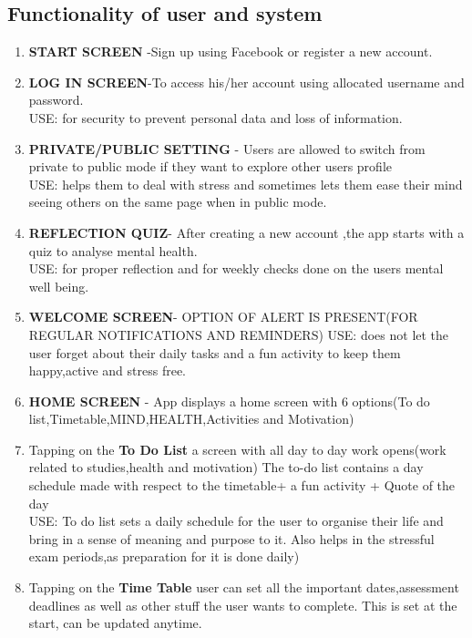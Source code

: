 \documentclass{article}
\begin{document}
\subsection{Functionality of user and system}
\begin{enumerate}
    \item \textbf{ START SCREEN} -Sign up using Facebook or register a new account.\\
    \item \textbf{LOG IN SCREEN}-To access his/her account using allocated username and password.\\
USE: for security to prevent personal data and loss of information.\\
    \item \textbf{PRIVATE/PUBLIC SETTING} - Users are allowed to switch from private to public mode if they want to explore other users profile\\
USE: helps them to deal with stress and sometimes lets them ease their mind seeing others on the same page when in public mode.
    \item \textbf{REFLECTION QUIZ}- After creating a new account ,the app starts with a quiz to analyse mental health.\\
USE: for proper reflection and for weekly checks done on the users mental well being.\\
    \item \textbf{WELCOME SCREEN}- OPTION OF ALERT IS PRESENT(FOR REGULAR NOTIFICATIONS AND REMINDERS)
USE: does not let the user forget about their daily tasks and a fun activity to keep them happy,active and stress free.\\
    \item \textbf{HOME SCREEN} - App displays a home screen with 6 options(To do list,Timetable,MIND,HEALTH,Activities and Motivation) 
    \item Tapping on the \textbf{To Do List} a screen with all day to day work opens(work related to studies,health and motivation) The to-do list contains a day schedule made with respect to the timetable+ a fun activity + Quote of the day\\
USE: To do list sets a daily schedule for the user to organise their life and bring in a sense of meaning and purpose to it. Also helps in the stressful exam periods,as preparation for it is done daily)
    \item Tapping on the \textbf{Time Table} user can set all the important dates,assessment deadlines as well as other stuff the user wants to complete. This is set at the start, can be updated anytime.

\end{enumerate}
\end{document}
